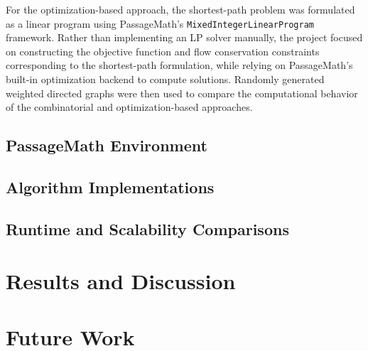 \documentclass[12pt]{report}
\begin{document}
For the optimization-based approach, the shortest-path problem was formulated as a linear program using PassageMath’s \texttt{MixedIntegerLinearProgram} framework. Rather than implementing an LP solver manually, the project focused on constructing the objective function and flow conservation constraints corresponding to the shortest-path formulation, while relying on PassageMath’s built-in optimization backend to compute solutions. Randomly generated weighted directed graphs were then used to compare the computational behavior of the combinatorial and optimization-based approaches.

\section{PassageMath Environment}

\section{Algorithm Implementations}

\section{Runtime and Scalability Comparisons}




\chapter{Results and Discussion}



\chapter{Future Work}
\end{document}
